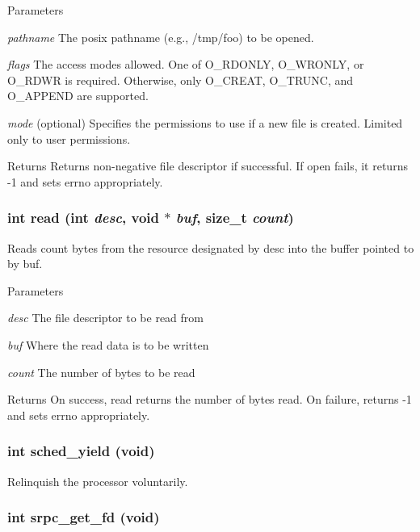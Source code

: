 \begin{DoxyParams}{Parameters}
\item[{\em pathname}]The posix pathname (e.g., /tmp/foo) to be opened. \item[{\em flags}]The access modes allowed. One of O\_\-RDONLY, O\_\-WRONLY, or O\_\-RDWR is required. Otherwise, only O\_\-CREAT, O\_\-TRUNC, and O\_\-APPEND are supported. \item[{\em mode}](optional) Specifies the permissions to use if a new file is created. Limited only to user permissions. \end{DoxyParams}
\begin{DoxyReturn}{Returns}
Returns non-\/negative file descriptor if successful. If open fails, it returns -\/1 and sets errno appropriately. 
\end{DoxyReturn}
\hypertarget{group__syscalls_ga709fa54ec765f9f1702f48b43d875a08}{
\subsubsection[{read}]{\setlength{\rightskip}{0pt plus 5cm}int read (int {\em desc}, \/  void $\ast$ {\em buf}, \/  size\_\-t {\em count})}}
\label{group__syscalls_ga709fa54ec765f9f1702f48b43d875a08}
Reads count bytes from the resource designated by desc into the buffer pointed to by buf. 
\begin{DoxyParams}{Parameters}
\item[{\em desc}]The file descriptor to be read from \item[{\em buf}]Where the read data is to be written \item[{\em count}]The number of bytes to be read \end{DoxyParams}
\begin{DoxyReturn}{Returns}
On success, read returns the number of bytes read. On failure, returns -\/1 and sets errno appropriately. 
\end{DoxyReturn}
\hypertarget{group__syscalls_ga357cd4b34c13011749dfffb42b489f09}{
\subsubsection[{sched\_\-yield}]{\setlength{\rightskip}{0pt plus 5cm}int sched\_\-yield (void)}}
\label{group__syscalls_ga357cd4b34c13011749dfffb42b489f09}
Relinquish the processor voluntarily. \hypertarget{group__syscalls_ga09d2f0c23245cbe6d78e532bbb7644a0}{
\subsubsection[{srpc\_\-get\_\-fd}]{\setlength{\rightskip}{0pt plus 5cm}int srpc\_\-get\_\-fd (void)}}
